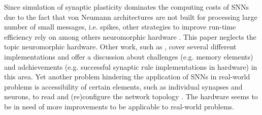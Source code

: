 Since simulation of synaptic plasticity dominates the computing costs of \acp{SNN} due to the fact that von Neumann architectures are not built for processing large number of small messages, i.e. spikes, 
other strategies to improve run-time efficiency rely on among others neuromorphic hardware \cite{simulation_STDP}.
This paper neglects the topic neuromorphic hardware.
Other work, such as \cite{Synaptic_plasticity}, 
cover several different implementations and offer a discussion about challenges (e.g. memory elements) and adchievements 
(e.g. successful synaptic rule implementations in hardware) in this area.
Yet another problem hindering the application of \acp{SNN} in real-world problems is accessibility of certain elements, such as individual synapses and neurons, 
to read and (re)configure the network topology \cite{hardware_STDP}.
The hardware seems to be in need of more improvements to be applicable to real-world problems.